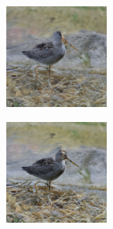 \documentclass{article}
\begin{document}
\begin{figure}
\begin{subfigure}[b]{0.5\linewidth}
\begin{subfigure}[b]{0.242\linewidth}
        \end{subfigure}
        \hfill
    \end{subfigure}%
    \begin{subfigure}[b]{0.5\linewidth}
        \begin{subfigure}[b]{0.242\linewidth}
        \includegraphics[width=\linewidth]{figures/imagenet128/solver_samples/imagenet128_fm_ot_273_05.png}
        \end{subfigure}
        \begin{subfigure}[b]{0.242\linewidth}
        \includegraphics[width=\linewidth]{figures/imagenet128/solver_samples/imagenet128_fm_ot_273_10.png}

\end{subfigure}
\end{subfigure}
\end{figure}
\end{document}
